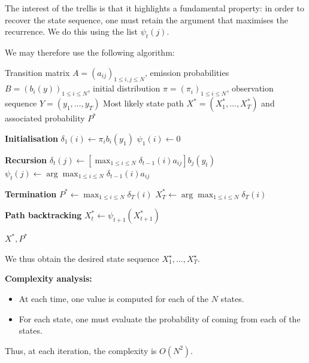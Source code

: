 \documentclass[11pt]{article}
\begin{document}
The interest of the trellis is that it highlights a fundamental property: in order to recover the state sequence, one must retain the argument that maximises the recurrence. We do this using the list $\psi_t(j)$.

We may therefore use the following algorithm:

\begin{algorithm}[H]
\caption{Viterbi Algorithm}
\label{alg:viterbi}
\begin{algorithmic}[1]
\Require Transition matrix $A = (a_{ij})_{1 \leq i,j \leq N}$,
emission probabilities $B = (b_i(y))_{1 \leq i \leq N}$,
initial distribution $\pi = (\pi_i)_{1 \leq i \leq N}$,
observation sequence $Y = (y_1,\dots,y_T)$
\Ensure Most likely state path $X^* = (X_1^*,\dots,X_T^*)$
and associated probability $P^*$

\Statex
\Statex \textbf{Initialisation}
    \State $\delta_1(i) \gets \pi_i b_i(y_1)$
    \State $\psi_1(i) \gets 0$
\EndFor

\Statex
\Statex \textbf{Recursion}
        \State $\displaystyle \delta_t(j) \gets
        \left[\max_{1 \leq i \leq N}
        \delta_{t-1}(i)a_{ij}\right] b_j(y_t)$
        \State $\displaystyle \psi_t(j) \gets
        \arg\max_{1 \leq i \leq N}
        \delta_{t-1}(i)a_{ij}$
    \EndFor
\EndFor

\Statex
\Statex \textbf{Termination}
\State $\displaystyle P^* \gets \max_{1 \leq i \leq N} \delta_T(i)$
\State $\displaystyle X_T^* \gets \arg\max_{1 \leq i \leq N} \delta_T(i)$

\Statex
\Statex \textbf{Path backtracking}
    \State $\displaystyle X_t^* \gets \psi_{t+1}(X_{t+1}^*)$
\EndFor

\State \Return $X^*, P^*$

\end{algorithmic}
\end{algorithm}

We thus obtain the desired state sequence $X_1^\star,\dots,X_T^\star$.

\vspace{0.3cm}

\textbf{Complexity analysis:}
\begin{itemize}
    \item At each time, one value is computed for each of the $N$ states.
    \item For each state, one must evaluate the probability of coming from each of the states.
\end{itemize}
Thus, at each iteration, the complexity is $O(N^2)$.
\end{document}
